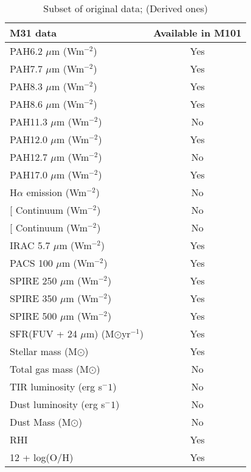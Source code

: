\begin{table}
\centering
\caption{Subset of original data; (Derived ones)}
\label{tab: derived_ones}
\begin{tabular}{ |l|c| }
\hline\hline
M31 data           & Available in M101 \\
\hline\hline
PAH6.2 $\mu$m (Wm$^{-2}$)  & Yes\\
PAH7.7 $\mu$m (Wm$^{-2}$)  & Yes\\
PAH8.3 $\mu$m (Wm$^{-2}$)  & Yes\\
PAH8.6 $\mu$m (Wm$^{-2}$)  & Yes\\
PAH11.3 $\mu$m (Wm$^{-2}$) & No \\
PAH12.0 $\mu$m (Wm$^{-2}$) & Yes\\
PAH12.7 $\mu$m (Wm$^{-2}$) & No \\
PAH17.0 $\mu$m (Wm$^{-2}$) &Yes \\
H$\alpha$ emission (Wm$^{-2}$) & No\\
{[}\sii{]} Continuum (Wm$^{-2}$) & No \\
{[}\oiii{]} Continuum (Wm$^{-2}$) & No \\
IRAC 5.7 $\mu$m (Wm$^{-2}$)& Yes\\
PACS 100 $\mu$m (Wm$^{-2}$)& Yes\\
SPIRE 250 $\mu$m (Wm$^{-2}$)& Yes\\
SPIRE 350 $\mu$m (Wm$^{-2}$)& Yes\\
SPIRE 500 $\mu$m (Wm$^{-2}$)& Yes\\
SFR(FUV + 24 $\mu$m) (M$\odot$yr$^{-1}$) & Yes\\
Stellar mass (M$\odot$)& Yes\\
Total gas mass (M$\odot$) & No \\
TIR luminosity (erg s$^-1$) & No \\
Dust luminosity (erg s$^-1$) & No \\
Dust Mass (M$\odot$)& No\\
RHI & Yes\\
12 + log(O/H)& Yes\\
\hline
\end{tabular}
\end{table}